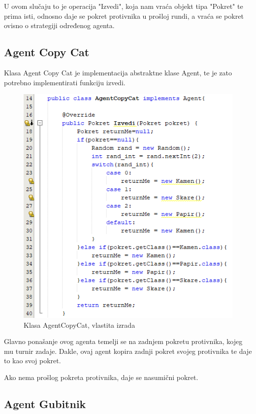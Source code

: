 \documentclass{foi}
\begin{document}
U ovom slučaju to je operacija "Izvedi", koja nam vraća objekt tipa "Pokret" te prima isti, odnosno daje se pokret protivnika u prošloj rundi, a vraća se pokret ovisno o strategiji određenog agenta.

\clearpage

\subsection{Agent Copy Cat}

Klasa Agent Copy Cat je implementacija abstraktne klase Agent, te je zato potrebno implementirati funkciju izvedi.

\begin{figure}[h!]
    \centering
    \includegraphics[scale=0.9]{slike/Screenshot_4.png}
    \caption{Klasa AgentCopyCat, vlastita izrada}
\end{figure}

Glavno ponašanje ovog agenta temelji se na zadnjem pokretu protivnika, kojeg mu turnir zadaje. Dakle, ovaj agent kopira zadnji pokret svojeg protivnika te daje to kao svoj pokret.

Ako nema prošlog pokreta protivnika, daje se nasumični pokret.

\clearpage

\subsection{Agent Gubitnik}
\end{document}
